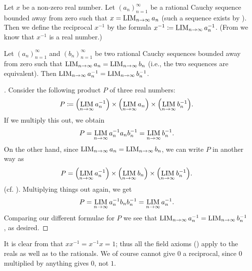 \begin{defn}\label{i:5.3.16}
  Let \(x\) be a non-zero real number.
  Let \((a_n)_{n = 1}^{\infty}\) be a rational Cauchy sequence bounded away from zero such that \(x = \operatorname*{LIM}_{n \to \infty} a_n\) (such a sequence exists by ).
  Then we define the reciprocal \(x^{-1}\) by the formula \(x^{-1} \coloneqq \operatorname*{LIM}_{n \to \infty} a_n^{-1}\).
  (From  we know that \(x^{-1}\) is a real number.)
\end{defn}

\begin{lem}\label{i:5.3.17}
  Let \((a_n)_{n = 1}^{\infty}\) and \((b_n)_{n = 1}^{\infty}\) be two rational Cauchy sequences bounded away from zero such that \(\operatorname*{LIM}_{n \to \infty} a_n = \operatorname*{LIM}_{n \to \infty} b_n\) (i.e., the two sequences are equivalent).
  Then \(\operatorname*{LIM}_{n \to \infty} a_n^{-1} = \operatorname*{LIM}_{n \to \infty} b_n^{-1}\).
\end{lem}

\begin{proof}[]
  Consider the following product \(P\) of three real numbers:
  \[
    P \coloneqq \pa{\LIM_{n \to \infty} a_n^{-1}} \times \pa{\LIM_{n \to \infty} a_n} \times \pa{\LIM_{n \to \infty} b_n^{-1}}.
  \]
  If we multiply this out, we obtain
  \[
    P = \operatorname*{LIM}_{n \to \infty} a_n^{-1} a_n b_n^{-1} = \operatorname*{LIM}_{n \to \infty} b_n^{-1}.
  \]
  On the other hand, since \(\operatorname*{LIM}_{n \to \infty} a_n = \operatorname*{LIM}_{n \to \infty} b_n\), we can write \(P\) in another way as
  \[
    P = \pa{\LIM_{n \to \infty} a_n^{-1}} \times \pa{\LIM_{n \to \infty} b_n} \times \pa{\LIM_{n \to \infty} b_n^{-1}}.
  \]
  (cf. ).
  Multiplying things out again, we get
  \[
    P = \operatorname*{LIM}_{n \to \infty} a_n^{-1} b_n b_n^{-1} = \operatorname*{LIM}_{n \to \infty} a_n^{-1}.
  \]
  Comparing our different formulae for \(P\) we see that \(\operatorname*{LIM}_{n \to \infty} a_n^{-1} = \operatorname*{LIM}_{n \to \infty} b_n^{-1}\), as desired.
\end{proof}

\begin{ac}\label{i:ac:5.3.3}
  It is clear from  that \(x x^{-1} = x^{-1} x = 1\);
  thus all the field axioms () apply to the reals as well as to the rationals.
  We of course cannot give \(0\) a reciprocal, since \(0\) multiplied by anything gives \(0\), not \(1\).
\end{ac}

